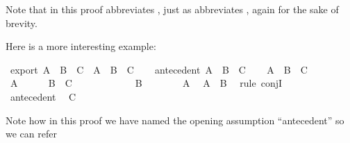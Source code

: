 \begin{isabellebody}
\isamarkupfalse%
%
\endisatagproof
{\isafoldproof}%
%
\isadelimproof
%
\endisadelimproof
%
\begin{isamarkuptext}%
Note that  in this proof abbreviates , just as 
abbreviates , again for the sake of brevity.%
\end{isamarkuptext}\isamarkuptrue%
%
\begin{isamarkuptext}%
Here is a more interesting example:%
\end{isamarkuptext}\isamarkuptrue%
\isamarkupfalse%
\ export{\isacharcolon}\ {\isachardoublequoteopen}{\isacharparenleft}A\ {\isasymand}\ B\ {\isasymlongrightarrow}\ C{\isacharparenright}\ {\isasymlongrightarrow}\ {\isacharparenleft}A\ {\isasymlongrightarrow}\ B\ {\isasymlongrightarrow}\ C{\isacharparenright}{\isachardoublequoteclose}\isanewline
%
\isadelimproof
%
\endisadelimproof
%
\isatagproof
{}\isamarkupfalse%
\isanewline
\ \ \isamarkupfalse%
\ antecedent{\isacharcolon}\ {\isachardoublequoteopen}A\ {\isasymand}\ B\ {\isasymlongrightarrow}\ C{\isachardoublequoteclose}\isanewline
\ \ \isamarkupfalse%
\ {\isachardoublequoteopen}A\ {\isasymlongrightarrow}\ B\ {\isasymlongrightarrow}\ C{\isachardoublequoteclose}\isanewline
\ \ \isamarkupfalse%
\isanewline
\ \ \ \ \isamarkupfalse%
\ {\isachardoublequoteopen}A{\isachardoublequoteclose}\isanewline
\ \ \ \ \isamarkupfalse%
\ {\isachardoublequoteopen}B\ {\isasymlongrightarrow}\ C{\isachardoublequoteclose}\isanewline
\ \ \ \ \isamarkupfalse%
\isanewline
\ \ \ \ \ \ \isamarkupfalse%
\ {\isachardoublequoteopen}B{\isachardoublequoteclose}\isanewline
\ \ \ \ \ \ \isamarkupfalse%
\ {\isacharbackquoteopen}A{\isacharbackquoteclose}\ \isamarkupfalse%
\ {\isachardoublequoteopen}A\ {\isasymand}\ B{\isachardoublequoteclose}\ \isamarkupfalse%
\ {\isacharparenleft}rule\ conjI{\isacharparenright}\isanewline
\ \ \ \ \ \ \isamarkupfalse%
\ antecedent\ \isamarkupfalse%
\ {\isachardoublequoteopen}C{\isachardoublequoteclose}\isacommand{{\isachardot}{\isachardot}}\isamarkupfalse%
\isanewline
\ \ \ \ \isamarkupfalse%
\isanewline
\ \ \isamarkupfalse%
\isanewline
{}\isamarkupfalse%
%
\endisatagproof
{\isafoldproof}%
%
\isadelimproof
%
\endisadelimproof
%
\begin{isamarkuptext}%
Note how in this proof we have named the opening assumption ``antecedent'' so we can refer

\end{isamarkuptext}
\end{isabellebody}
